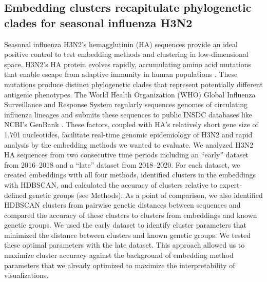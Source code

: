 \documentclass[webpdf,contemporary,large,single]{oup-authoring-template}%
\theoremstyle{thmstyleone}%
\theoremstyle{thmstyletwo}%
\theoremstyle{thmstylethree}%
\begin{document}
\subsection{Embedding clusters recapitulate phylogenetic clades for seasonal influenza H3N2}

Seasonal influenza H3N2's hemagglutinin (HA) sequences provide an ideal positive control to test embedding methods and clustering in low-dimensional space.
H3N2's HA protein evolves rapidly, accumulating amino acid mutations that enable escape from adaptive immunity in human populations \citep{Petrova2018}.
These mutations produce distinct phylogenetic clades that represent potentially different antigenic phenotypes.
The World Health Organization (WHO) Global Influenza Surveillance and Response System regularly sequences genomes of circulating influenza lineages \citep{Hay2018} and submits these sequences to public INSDC databases like NCBI's GenBank \citep{Arita2021}.
These factors, coupled with HA's relatively short gene size of 1,701 nucleotides, facilitate real-time genomic epidemiology of H3N2 \citep{Neher2015} and rapid analysis by the embedding methods we wanted to evaluate.
We analyzed H3N2 HA sequences from two consecutive time periods including an ``early'' dataset from 2016--2018 and a ``late'' dataset from 2018--2020.
For each dataset, we created embeddings with all four methods, identified clusters in the embeddings with HDBSCAN, and calculated the accuracy of clusters relative to expert-defined genetic groups (see Methods).
As a point of comparison, we also identified HDBSCAN clusters from pairwise genetic distances between sequences and compared the accuracy of these clusters to clusters from embeddings and known genetic groups.
We used the early dataset to identify cluster parameters that minimized the distance between clusters and known genetic groups.
We tested these optimal parameters with the late dataset.
This approach allowed us to maximize cluster accuracy against the background of embedding method parameters that we already optimized to maximize the interpretability of visualizations.
\end{document}
